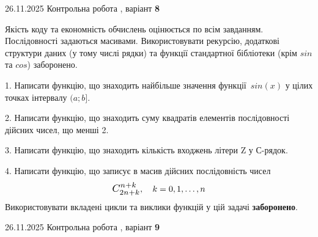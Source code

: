 \documentclass[11pt, ukrainian]{article}
\begin{document}
{{{{{{{\begin {large}
\end{large}
\vspace{20mm}


{{26.11.2025 Контрольна робота , варіант  \No \textbf { 8 }\par}}


{
Якість коду та економність обчислень оцінюється по всім завданням. Послідовності задаються масивами. Використовувати рекурсію, додаткові структури даних (у тому числі рядки) та функції стандартної бібліотеки (крім $sin$ та $cos$) заборонено.

\vspace{2mm}

\begin {large}
1. Написати функцію, що знаходить найбільше значення функції~$sin(x)$ у цілих точках інтервалу $(a; b]$.

\vspace{2mm}


2. Написати функцію, що знаходить суму квадратів елементів послідовності дійсних чисел, що менші 2.

\vspace{2mm}


3. Написати функцію, що знаходить кількість входжень літери Z у С-рядок.

\vspace{2mm}


4. 
Написати функцію, що записує в масив дійсних послідовність чисел
$$\scalebox{1.2}{$C_{2n+k}^{n+k}$}, \quad k=0,1,\ldots,n$$
\quad Використовувати вкладені цикли та виклики функцій у цій задачі \textbf{заборонено}.

\vspace{2mm}

\end{large}
\vspace{20mm}


{{26.11.2025 Контрольна робота , варіант  \No \textbf { 9 }\par}}

}}}}}}}}
\end{document}
